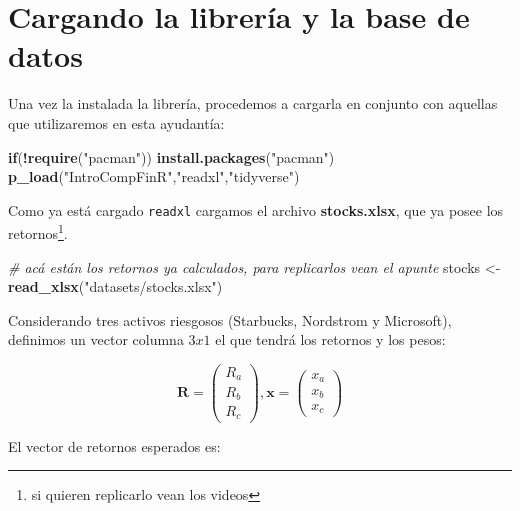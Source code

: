 \documentclass[12pt,]{book}
\newenvironment{Shaded}{\begin{snugshade}}{\end{snugshade}}
\newcommand{\KeywordTok}[1]{\textcolor[rgb]{0.13,0.29,0.53}{\textbf{#1}}}
\newcommand{\StringTok}[1]{\textcolor[rgb]{0.31,0.60,0.02}{#1}}
\newcommand{\CommentTok}[1]{\textcolor[rgb]{0.56,0.35,0.01}{\textit{#1}}}
\newcommand{\ControlFlowTok}[1]{\textcolor[rgb]{0.13,0.29,0.53}{\textbf{#1}}}
\newcommand{\OperatorTok}[1]{\textcolor[rgb]{0.81,0.36,0.00}{\textbf{#1}}}
\newcommand{\NormalTok}[1]{#1}
\begin{document}
\section{Cargando la librería y la base de
datos}\label{cargando-la-libreria-y-la-base-de-datos}

Una vez la instalada la librería, procedemos a cargarla en conjunto con
aquellas que utilizaremos en esta ayudantía:

\begin{Shaded}
\begin{Highlighting}[]
\ControlFlowTok{if}\NormalTok{(}\OperatorTok{!}\KeywordTok{require}\NormalTok{(}\StringTok{"pacman"}\NormalTok{)) }\KeywordTok{install.packages}\NormalTok{(}\StringTok{"pacman"}\NormalTok{)}
\KeywordTok{p_load}\NormalTok{(}\StringTok{"IntroCompFinR"}\NormalTok{,}\StringTok{"readxl"}\NormalTok{,}\StringTok{"tidyverse"}\NormalTok{)}
\end{Highlighting}
\end{Shaded}

Como ya está cargado \texttt{readxl} cargamos el archivo
\textbf{stocks.xlsx}, que ya posee los retornos\footnote{si quieren
  replicarlo vean los videos}.

\begin{Shaded}
\begin{Highlighting}[]
\CommentTok{# acá están los retornos ya calculados, para replicarlos vean el apunte}
\NormalTok{stocks <-}\StringTok{ }\KeywordTok{read_xlsx}\NormalTok{(}\StringTok{"datasets/stocks.xlsx"}\NormalTok{)}
\end{Highlighting}
\end{Shaded}

Considerando tres activos riesgosos (Starbucks, Nordstrom y Microsoft),
definimos un vector columna \(3x1\) el que tendrá los retornos y los
pesos:

\[
\mathbf{R} = 
\begin{pmatrix}
    R_{a}  \\
    R_{b}  \\
    R_{c} 
\end{pmatrix}
,
\mathbf{x} =
\begin{pmatrix}
    x_{a} \\
    x_{b} \\
    x_{c}
\end{pmatrix}
\]

El vector de retornos esperados es:
\end{document}
